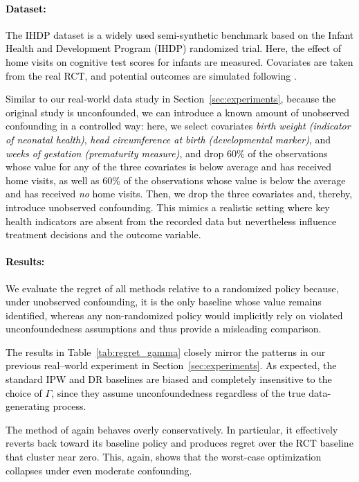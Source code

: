 \documentclass{article} %
\theoremstyle{plain}
\theoremstyle{definition}
\theoremstyle{remark}
\newcommand{\rebuttal}[1]{\textcolor{black}{#1}}
\begin{document}
\paragraph{\rebuttal{Dataset:}}
\rebuttal{The IHDP dataset is a widely used semi-synthetic benchmark based on the Infant Health and Development Program (IHDP) randomized trial. Here, the effect of home visits on cognitive test scores for infants are measured. 
Covariates are taken from the real RCT, and potential outcomes are simulated following \citet{Hill.2011}. }

\rebuttal{Similar to our real-world data study in Section~\ref{sec:experiments}, because the original study is unconfounded, we can introduce a known amount of unobserved confounding in a controlled way: here, we select covariates \emph{birth weight (indicator of neonatal health)}, \emph{head circumference at birth (developmental marker)}, and \emph{weeks of gestation (prematurity measure)}, and drop $60\%$ of the observations whose value for any of the three covariates is below average and has received home visits, as well as $60\%$ of the observations whose value is below the average and has received \emph{no} home visits. Then, we drop the three covariates and, thereby, introduce unobserved confounding.  This mimics a realistic setting where key health indicators are absent from the recorded data but nevertheless influence treatment decisions and the outcome variable.  }

\paragraph{\rebuttal{Results:}}
\rebuttal{We evaluate the regret of all methods relative to a randomized policy because, under unobserved confounding, it is the only baseline whose value remains identified, whereas any non-randomized policy would implicitly rely on violated unconfoundedness assumptions and thus provide a misleading comparison.}

\rebuttal{The results in Table~\ref{tab:regret_gamma} closely mirror the patterns in our previous real–world experiment in Section~\ref{sec:experiments}. 
As expected, the standard IPW and DR baselines are biased and completely insensitive to the choice of $\Gamma$, since they assume unconfoundedness regardless of the true data-generating process. }

\rebuttal{The method of \citet{Kallus.2018c,Kallus.2021d} again behaves overly conservatively. In particular, it effectively reverts back toward its baseline policy and produces regret over the RCT baseline that cluster near zero. This, again, shows that the worst-case optimization collapses under even moderate confounding. }
\end{document}
